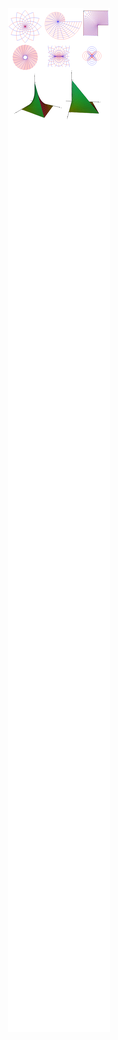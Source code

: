 \begin{figure}[t!]
\centering
\begin{subfigure}[t]{0.5\textwidth}
\centering
\includegraphics[scale=0.4,trim={54px 9132px 462px 643px},clip]{images/04_analisis2/am2.png}

\end{subfigure}
\end{figure}
